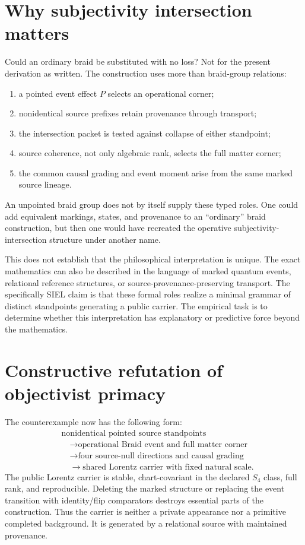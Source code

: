 \documentclass[11pt]{article}
\theoremstyle{definition}
\theoremstyle{remark}
\begin{document}
\section{Why subjectivity intersection matters}

Could an ordinary braid be substituted with no loss? Not for the present derivation as written. The construction uses more than braid-group relations:
\begin{enumerate}
\item a pointed event effect $P$ selects an operational corner;
\item nonidentical source prefixes retain provenance through transport;
\item the intersection packet is tested against collapse of either standpoint;
\item source coherence, not only algebraic rank, selects the full matter corner;
\item the common causal grading and event moment arise from the same marked source lineage.
\end{enumerate}
An unpointed braid group does not by itself supply these typed roles. One could add equivalent markings, states, and provenance to an ``ordinary'' braid construction, but then one would have recreated the operative subjectivity-intersection structure under another name.

This does not establish that the philosophical interpretation is unique. The exact mathematics can also be described in the language of marked quantum events, relational reference structures, or source-provenance-preserving transport. The specifically SIEL claim is that these formal roles realize a minimal grammar of distinct standpoints generating a public carrier. The empirical task is to determine whether this interpretation has explanatory or predictive force beyond the mathematics.

\section{Constructive refutation of objectivist primacy}

The counterexample now has the following form:
\begin{equation}
 \begin{aligned}
 &\text{nonidentical pointed source standpoints}\\
 &\quad\longrightarrow\text{operational Braid event and full matter corner}\\
 &\quad\longrightarrow\text{four source-null directions and causal grading}\\
 &\quad\longrightarrow\text{shared Lorentz carrier with fixed natural scale}.
 \end{aligned}
\end{equation}
The public Lorentz carrier is stable, chart-covariant in the declared $S_4$ class, full rank, and reproducible. Deleting the marked structure or replacing the event transition with identity/flip comparators destroys essential parts of the construction. Thus the carrier is neither a private appearance nor a primitive completed background. It is generated by a relational source with maintained provenance.
\end{document}

